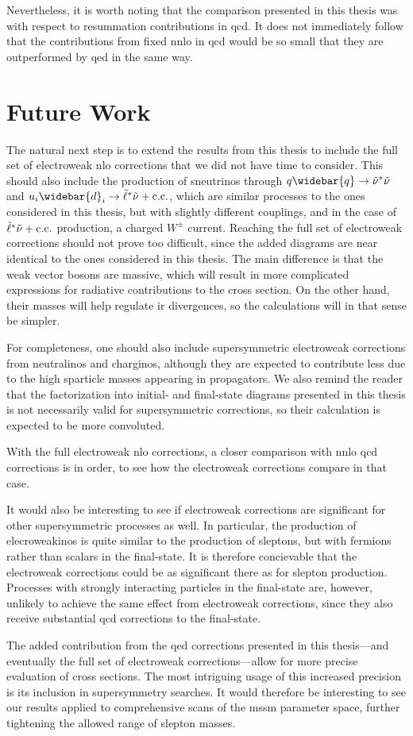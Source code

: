 Nevertheless, it is worth noting that the comparison presented in this thesis was with respect to resummation contributions in \gls{qcd}.
It does not immediately follow that the contributions from fixed \gls{nnlo} in \gls{qcd} would be so small that they are outperformed by \gls{qed} in the same way.

\section*{Future Work}
The natural next step is to extend the results from this thesis to include the full set of electroweak \gls{nlo} corrections that we did not have time to consider.
This should also include the production of sneutrinos through $q\widebar{q}\to\tilde\nu^*\tilde\nu$ and $u_i\widebar{d}_i\to\slepton^*\tilde\nu+\text{c.c.}$, which are similar processes to the ones considered in this thesis, but with slightly different couplings, and in the case of ${\tilde{\ell}}^*\tilde\nu+\text{c.c.}$ production, a charged $W^\pm$ current.
Reaching the full set of electroweak corrections should not prove too difficult, since the added diagrams are near identical to the ones considered in this thesis.
The main difference is that the weak vector bosons are massive, which will result in more complicated expressions for radiative contributions to the cross section.
On the other hand, their masses will help regulate \gls{ir} divergences, so the calculations will in that sense be simpler.

For completeness, one should also include supersymmetric electroweak corrections from neutralinos and charginos, although they are expected to contribute less due to the high sparticle masses appearing in propagators. We also remind the reader that the factorization into initial- and final-state diagrams presented in this thesis is not necessarily valid for supersymmetric corrections, so their calculation is expected to be more convoluted.

With the full electroweak \gls{nlo} corrections, a closer comparison with \gls{nnlo} \gls{qcd} corrections is in order, to see how the electroweak corrections compare in that case.

It would also be interesting to see if electroweak corrections are significant for other supersymmetric processes as well.
In particular, the production of elecroweakinos is quite similar to the production of sleptons, but with fermions rather than scalars in the final-state.
It is therefore concievable that the electroweak corrections could be as significant there as for slepton production.
Processes with strongly interacting particles in the final-state are, however, unlikely to achieve the same effect from electroweak corrections, since they also receive substantial \gls{qcd} corrections to the final-state.

The added contribution from the \gls{qed} corrections presented in this thesis---and eventually the full set of electroweak corrections---allow for more precise evaluation of cross sections.
The most intriguing usage of this increased precision is its inclusion in supersymmetry searches.
It would therefore be interesting to see our results applied to comprehensive scans of the \gls{mssm} parameter space, further tightening the allowed range of slepton masses.